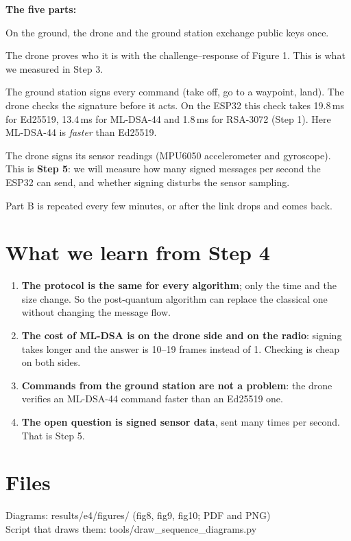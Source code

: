 \documentclass[10pt,a4paper]{article}
\begin{document}
\textbf{The five parts:}
\begin{description}[nosep,leftmargin=1.2em,font=\normalfont\bfseries]
  \item[A --- Registration.] On the ground, the drone and the ground station exchange public keys once.
  \item[B --- Before take-off.] The drone proves who it is with the challenge--response of Figure 1.
        This is what we measured in Step 3.
  \item[C --- Commands in flight.] The ground station signs every command (take off, go to a waypoint,
        land). The drone checks the signature before it acts. On the ESP32 this check takes
        19.8\,ms for Ed25519, 13.4\,ms for ML-DSA-44 and 1.8\,ms for RSA-3072 (Step 1). Here ML-DSA-44
        is \emph{faster} than Ed25519.
  \item[D --- Sensor data in flight.] The drone signs its sensor readings (MPU6050 accelerometer and
        gyroscope). This is \textbf{Step 5}: we will measure how many signed messages per second the
        ESP32 can send, and whether signing disturbs the sensor sampling.
  \item[E --- Repeat.] Part B is repeated every few minutes, or after the link drops and comes back.
\end{description}

\section{What we learn from Step 4}

\begin{enumerate}[nosep]
  \item \textbf{The protocol is the same for every algorithm}; only the time and the size change.
        So the post-quantum algorithm can replace the classical one without changing the message
        flow.
  \item \textbf{The cost of ML-DSA is on the drone side and on the radio}: signing takes longer
        and the answer is 10--19 frames instead of 1. Checking is cheap on both sides.
  \item \textbf{Commands from the ground station are not a problem}: the drone verifies an ML-DSA-44
        command faster than an Ed25519 one.
  \item \textbf{The open question is signed sensor data}, sent many times per second. That is
        Step 5.
\end{enumerate}

\section*{Files}

{\small\ttfamily
Diagrams: results/e4/figures/ (fig8, fig9, fig10; PDF and PNG)\\
Script that draws them: tools/draw\_sequence\_diagrams.py
}
\end{document}
